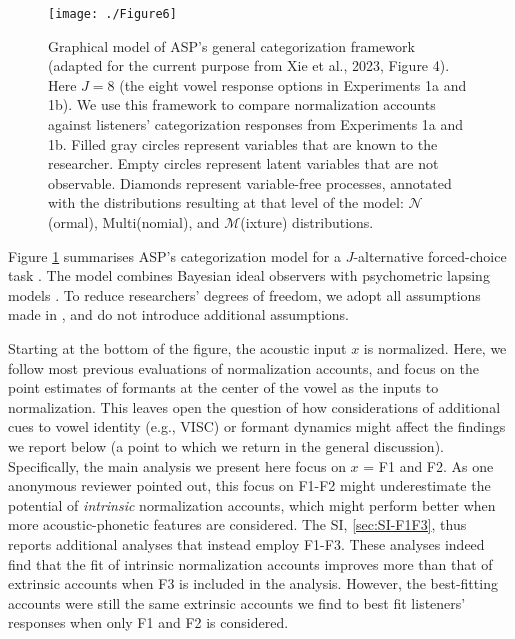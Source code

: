 \documentclass[preprint]{JASA}
\begin{document}
\begin{figure}[!ht]

{\centering \texttt{[image: ./Figure6]} 

}

\caption{Graphical model of ASP's general categorization framework (adapted for the current purpose from Xie et al., 2023, Figure 4). Here \(J=8\) (the eight vowel response options in Experiments 1a and 1b). We use this framework to compare normalization accounts against listeners' categorization responses from Experiments 1a and 1b. Filled gray circles represent variables that are known to the researcher. Empty circles represent latent variables that are not observable. Diamonds represent variable-free processes, annotated with the distributions resulting at that level of the model: \(\mathcal{N}\)(ormal), Multi(nomial), and \(\mathcal{M}\)(ixture) distributions.}\label{fig:model-perceptual-decision-making}
\end{figure}

Figure \ref{fig:model-perceptual-decision-making} summarises ASP's categorization model for a \(J\)-alternative forced-choice task \citep[for an in-depth description, we refer to][]{xie2023}. The model combines Bayesian ideal observers \citetext{\citealp[as used in e.g.,][]{clayards2008}; \citealp{feldman2009}; \citealp{norris-mcqueen2008}; \citealp{xie2021}; \citealp[for a closely related approach, see also][]{nearey-hogan1986}} with psychometric lapsing models \citep{wichmann-hill2001}. To reduce researchers' degrees of freedom, we adopt all assumptions made in \citet{xie2023}, and do not introduce additional assumptions.

Starting at the bottom of the figure, the acoustic input \(x\) is normalized. Here, we follow most previous evaluations of normalization accounts, and focus on the point estimates of formants at the center of the vowel as the inputs to normalization. This leaves open the question of how considerations of additional cues to vowel identity (e.g., VISC) or formant dynamics might affect the findings we report below (a point to which we return in the general discussion). Specifically, the main analysis we present here focus on \(x\) = F1 and F2. As one anonymous reviewer pointed out, this focus on F1-F2 might underestimate the potential of \emph{intrinsic} normalization accounts, which might perform better when more acoustic-phonetic features are considered. The SI, \ref{sec:SI-F1F3}, thus reports additional analyses that instead employ F1-F3. These analyses indeed find that the fit of intrinsic normalization accounts improves more than that of extrinsic accounts when F3 is included in the analysis. However, the best-fitting accounts were still the same extrinsic accounts we find to best fit listeners' responses when only F1 and F2 is considered.
\end{document}
